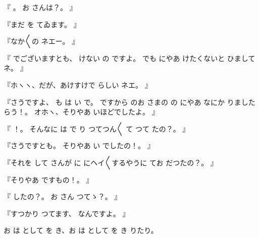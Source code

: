 『
。
お
さんは？。
』

『まだ
を
てゐます。
』

『なか〳〵の
ネエー。
』

『
でございますとも、
けない
の
ですよ。
でも
にやあ
けたくないと
ひましてネ。
』

『ホヽヽ、だが、あけすけで
らしい
ネエ。
』

『さうですよ、
も
は
い
で。
ですから
のお
さまの
の
にやあ
なにか
りましたらう！。
オホヽ、そりやあ
いほどでしたよ。
』

『
！。
そんなに
は
で
り
つてつん〳〵
て
つて
たの？。
』

『さうですとも。
そりやあ
い
でしたの！。
』

『それを
して
さんが
に
にヘイ〳〵するやうに
てお
だつたの？。
』

『そりやあ
ですもの！。
』

『
したの？。
お
さん
つてゝ？。
』

『すつかり
つてます、
なんですよ。
』

お
は
として
を
き、お
は
として
を
き
りたり。

